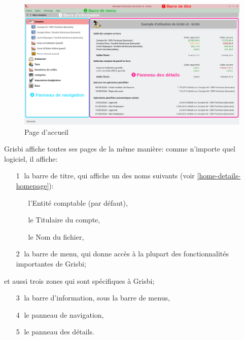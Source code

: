 
\begin{figure}[htbp]			%
\begin{center}
\includegraphics[width=1\textwidth]{image/screenshot/home_3.0.png}
\end{center}
\caption{Page d'accueil}		%
\label{home_3.0}
\end{figure}


Grisbi affiche toutes ses pages de la même manière: comme n'importe quel logiciel, il affiche:%

\begin{itemize}%
	\item[\large\textcircled{\small 1}] la barre de titre, qui affiche un des noms suivants (voir \vref{home-details-homepage}):%
		\begin{itemize}
			\item[\textopenbullet] l'Entité comptable (par défaut),
			\item[\textopenbullet] le Titulaire du compte,
			\item[\textopenbullet] le Nom du fichier,
		\end{itemize}
	\item[\large\textcircled{\small 2}] la barre de menu, qui donne accès à la plupart des fonctionnalités importantes de Grisbi;
\end{itemize}
et aussi trois zones qui sont spécifiques à Grisbi;
\begin{itemize}%
	\item[\large\textcircled{\small 3}] la barre d'information, sous la barre de menus,
	\item[\large\textcircled{\small 4}] le panneau de navigation,
	\item[\large\textcircled{\small 5}] le panneau des détails.
\end{itemize}



